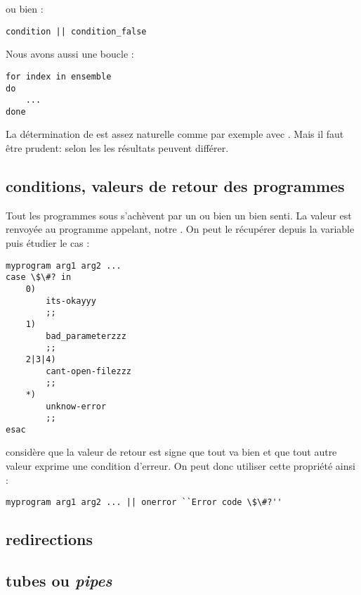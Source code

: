 ou bien :
\begin{lstlisting}
condition || condition_false
\end{lstlisting}

Nous avons aussi une boucle  :
\begin{lstlisting}
for index in ensemble
do
	...
done
\end{lstlisting}

La détermination de  est assez naturelle comme par exemple avec . Mais il faut être prudent: selon les \shells les résultats peuvent différer.

\subsection{conditions, valeurs de retour des programmes}

Tout les programmes sous \unix s'achèvent par un  ou bien un  bien senti. La valeur  est renvoyée au programme appelant, notre \shell. On peut le récupérer depuis la variable  puis étudier le cas :
\begin{lstlisting}
myprogram arg1 arg2 ...
case \$\#? in
	0)
		its-okayyy
		;;
	1)
		bad_parameterzzz
		;;
	2|3|4)
		cant-open-filezzz
		;;
	*)
		unknow-error
		;;
esac
\end{lstlisting}

\unix considère que la valeur de retour  est signe que tout va bien et que tout autre valeur exprime une condition d'erreur. On peut donc utiliser cette propriété ainsi :

\begin{lstlisting}
myprogram arg1 arg2 ... || onerror ``Error code \$\#?''
\end{lstlisting}

\subsection{redirections}

\subsection{tubes ou \emph{pipes}}
